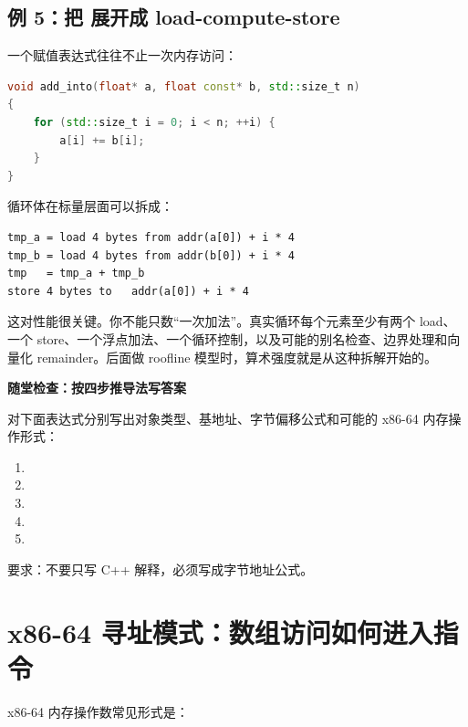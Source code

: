 \subsection{例 5：把  展开成 load-compute-store}

一个赋值表达式往往不止一次内存访问：

\begin{lstlisting}[language=C++]
void add_into(float* a, float const* b, std::size_t n)
{
    for (std::size_t i = 0; i < n; ++i) {
        a[i] += b[i];
    }
}
\end{lstlisting}

循环体在标量层面可以拆成：

\begin{lstlisting}
tmp_a = load 4 bytes from addr(a[0]) + i * 4
tmp_b = load 4 bytes from addr(b[0]) + i * 4
tmp   = tmp_a + tmp_b
store 4 bytes to   addr(a[0]) + i * 4
\end{lstlisting}

这对性能很关键。你不能只数“一次加法”。真实循环每个元素至少有两个 load、一个 store、一个浮点加法、一个循环控制，以及可能的别名检查、边界处理和向量化 remainder。后面做 roofline 模型时，算术强度就是从这种拆解开始的。

\begin{exercisebox}
\textbf{随堂检查：按四步推导法写答案}

对下面表达式分别写出对象类型、基地址、字节偏移公式和可能的 x86-64 内存操作形式：

\begin{enumerate}
  \item {}
  \item {}
  \item {}
  \item {}
  \item {}
\end{enumerate}

要求：不要只写 C++ 解释，必须写成字节地址公式。
\end{exercisebox}

\section{x86-64 寻址模式：数组访问如何进入指令}

x86-64 内存操作数常见形式是：

